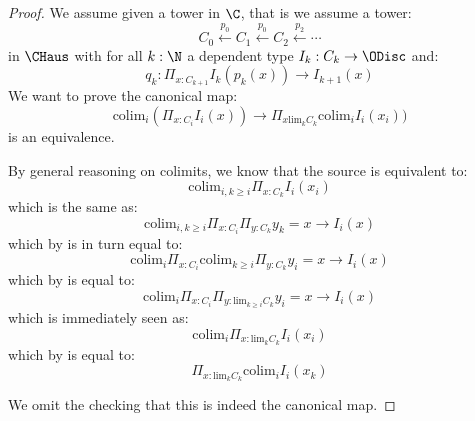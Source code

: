 \begin{proof}
We assume given a tower in $\C$, that is we assume a tower:
\[C_0 \overset{p_0}{\leftarrow} C_1 \overset{p_0}{\leftarrow} C_2 \overset{p_2}{\leftarrow}\cdots \]
in $\CHaus$ with for all $k:\N$ a dependent type $I_k:C_k\to \ODisc$ and:
\[q_k : \Pi_{x:C_{k+1}}I_k(p_k(x))\to I_{k+1}(x)\]
We want to prove the canonical map:
\[\mathrm{colim}_i (\Pi_{x:C_i}I_i(x)) \to \Pi_{x\mathrm{lim}_kC_k}\mathrm{colim}_i I_i(x_i))\]
is an equivalence. 

By general reasoning on colimits, we know that the source is equivalent to:
\[\mathrm{colim}_{i,k\geq i} \Pi_{x:C_k} I_i(x_i)\]
which is the same as:
\[\mathrm{colim}_{i,k\geq i} \Pi_{x:C_i}\Pi_{y:C_k} y_k=x \to I_i(x)\]
which by  is in turn equal to:
\[\mathrm{colim}_i\Pi_{x:C_i} \mathrm{colim}_{k\geq i} \Pi_{y:C_k} y_i = x \to I_i(x)\]
which by  is equal to:
\[\mathrm{colim}_i\Pi_{x:C_i} \Pi_{y:\mathrm{lim}_{k\geq i} C_k} y_i=x \to I_i(x)\]
which is immediately seen as:
\[\mathrm{colim}_i\Pi_{x:\mathrm{lim}_{k} C_k} I_i(x_i)\]
which by  is equal to:
\[\Pi_{x:\mathrm{lim}_{k} C_k} \mathrm{colim}_i I_i(x_k)\]

We omit the checking that this is indeed the canonical map.
\end{proof}

